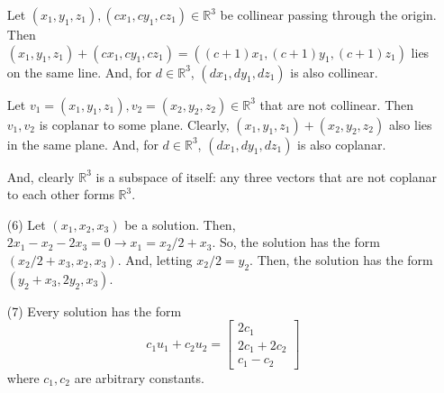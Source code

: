 \begin{itemize}
Let $(x_1, y_1, z_1), (cx_1, cy_1, cz_1) \in \mathbb{R}^3$ be collinear passing through the origin. Then $(x_1, y_1, z_1) + (cx_1, cy_1, cz_1) = ((c + 1)x_1, (c + 1)y_1, (c + 1)z_1)$ lies on the same line. And, for $d \in \mathbb{R}^3$, $(dx_1, dy_1, dz_1)$ is also collinear.

Let $v_1 = (x_1, y_1, z_1), v_2 = (x_2, y_2, z_2) \in \mathbb{R}^3$ that are not collinear. Then $v_1, v_2$ is coplanar to some plane. Clearly, $(x_1, y_1, z_1) + (x_2, y_2, z_2)$ also lies in the same plane. And, for $d \in \mathbb{R}^3$, $(dx_1, dy_1, dz_1)$ is also coplanar.

And, clearly $\mathbb{R}^3$ is a subspace of itself: any three vectors that are not coplanar to each other forms $\mathbb{R}^3$.
\item[(6)]
Let $(x_1, x_2, x_3)$ be a solution. Then, $2x_1 - x_2 - 2x_3 = 0 \rightarrow x_1 = x_2/2 + x_3$. So, the solution has the form $(x_2/2 + x_3, x_2, x_3)$. And, letting $x_2/2 = y_2$. Then, the solution has the form $(y_2 + x_3, 2y_2, x_3)$.
\item[(7)]
Every solution has the form
$$c_1u_1 + c_2u_2 = \begin{bmatrix}
2c_1 \\
2c_1 + 2c_2 \\
c_1 - c_2
\end{bmatrix}$$
where $c_1, c_2$ are arbitrary constants.
\end{itemize}
%